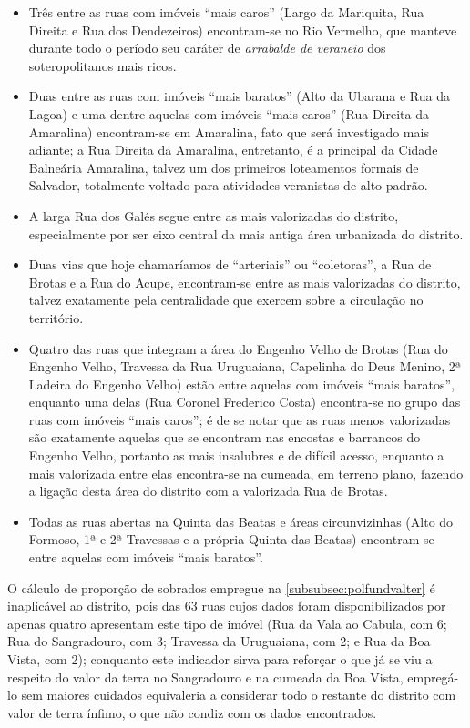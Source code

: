 


\begin{itemize}
\item Três entre as ruas com imóveis ``mais caros'' (Largo da Mariquita, Rua Direita e Rua dos Dendezeiros) encontram-se no Rio Vermelho, que manteve durante todo o período seu caráter de \textit{arrabalde de veraneio} dos soteropolitanos mais ricos. 
\item Duas entre as ruas com imóveis ``mais baratos'' (Alto da Ubarana e Rua da Lagoa) e uma dentre aquelas com imóveis ``mais caros'' (Rua Direita da Amaralina) encontram-se em Amaralina, fato que será investigado mais adiante; a Rua Direita da Amaralina, entretanto, é a principal da Cidade Balneária Amaralina, talvez um dos primeiros loteamentos formais de Salvador, totalmente voltado para atividades veranistas de alto padrão.
\item A larga Rua dos Galés segue entre as mais valorizadas do distrito, especialmente por ser eixo central da mais antiga área urbanizada do distrito.
\item Duas vias que hoje chamaríamos de ``arteriais'' ou ``coletoras'', a Rua de Brotas e a Rua do Acupe, encontram-se entre as mais valorizadas do distrito, talvez exatamente pela centralidade que exercem sobre a circulação no território.
\item Quatro das ruas que integram a área do Engenho Velho de Brotas (Rua do Engenho Velho, Travessa da Rua Uruguaiana, Capelinha do Deus Menino, 2ª Ladeira do Engenho Velho) estão entre aquelas com imóveis ``mais baratos'', enquanto uma delas (Rua Coronel Frederico Costa) encontra-se no grupo das ruas com imóveis ``mais caros''; é de se notar que as ruas menos valorizadas são exatamente aquelas que se encontram nas encostas e barrancos do Engenho Velho, portanto as mais insalubres e de difícil acesso, enquanto a mais valorizada entre elas encontra-se na cumeada, em terreno plano, fazendo a ligação desta área do distrito com a valorizada Rua de Brotas.
\item Todas as ruas abertas na Quinta das Beatas e áreas circunvizinhas (Alto do Formoso, 1ª e 2ª Travessas e a própria Quinta das Beatas) encontram-se entre aquelas com imóveis ``mais baratos''.
\end{itemize}

O cálculo de proporção de sobrados empregue na \autoref{subsubsec:polfundvalter} é inaplicável ao distrito, pois das 63 ruas cujos dados foram disponibilizados por  apenas quatro apresentam este tipo de imóvel (Rua da Vala ao Cabula, com 6; Rua do Sangradouro, com 3; Travessa da Uruguaiana, com 2; e Rua da Boa Vista, com 2); conquanto este indicador sirva para reforçar o que já se viu a respeito do valor da terra no Sangradouro e na cumeada da Boa Vista, empregá-lo sem maiores cuidados equivaleria a considerar todo o restante do distrito com valor de terra ínfimo, o que não condiz com os dados encontrados. 

